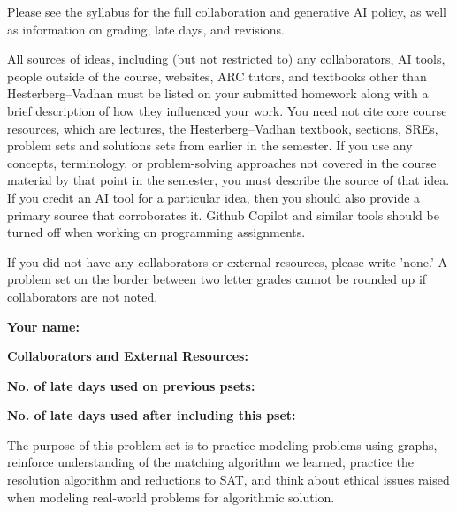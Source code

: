 \documentclass[11pt]{article}
\begin{document}

Please see the syllabus for the full collaboration and generative AI policy, as well as information on grading, late days, and revisions.

All sources of ideas, including (but not restricted to) any collaborators, AI tools, people outside of the course, websites, ARC tutors, and textbooks other than Hesterberg--Vadhan must be listed on your submitted homework along with a brief description of how they influenced your work. You need not cite core course resources, which are lectures, the Hesterberg--Vadhan textbook, sections, SREs, problem sets and solutions sets from earlier in the semester. If you use any concepts, terminology, or problem-solving approaches not covered in the course material by that point in the semester, you must describe the source of that idea. If you credit an AI tool for a particular idea, then you should also provide a primary source that corroborates it. Github Copilot and similar tools should be turned off when working on programming assignments.

If you did not have any collaborators or external resources, please write 'none.' A problem set on the border between two letter grades cannot be rounded up if collaborators are not noted.

\vspace{1em}

\textbf{Your name: }

\textbf{Collaborators and External Resources: }

\textbf{No. of late days used on previous psets: }

\textbf{No. of late days used after including this pset: }

\vspace{1em}

The purpose of this problem set is to practice modeling problems using graphs, reinforce understanding of the matching algorithm we learned, practice the resolution algorithm and reductions to SAT, and think about ethical issues raised when modeling real-world problems for algorithmic solution.
\end{document}
